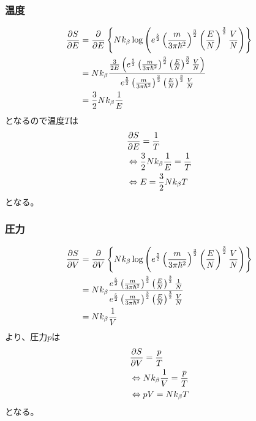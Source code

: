 \documentclass{jsarticle}  %
\numberwithin{equation}{section} %
\numberwithin{figure}{section}
\begin{document}
\subsubsection{温度}
    \begin{align}
        \frac{\partial S}{\partial E} &= \frac{\partial }{\partial E} \left\{ Nk_\beta \log \left( e^{\frac{5}{2}} \left(\frac{m}{3 \pi \hbar^2} \right)^{\frac{3}{2}} \left( \frac{E}{N} \right)^{\frac{3}{2}} \frac{V}{N} \right) \right\} \notag \\
        &= Nk_\beta \frac{ \frac{3}{2E}\left( e^{\frac{5}{2}} \left(\frac{m}{3 \pi \hbar^2} \right)^{\frac{3}{2}} \left(\frac{E}{N} \right)^{\frac{3}{2}} \frac{V}{N} \right)}{e^{\frac{5}{2}} \left(\frac{m}{3 \pi \hbar^2} \right)^{\frac{3}{2}} \left( \frac{E}{N} \right)^{\frac{3}{2}} \frac{V}{N}} \notag \\
        &=\frac{3}{2} N k_\beta \frac{1}{E} \notag 
    \end{align}
    となるので温度$T$は
    \begin{align}
        &\frac{\partial S}{\partial E} = \frac{1}{T} \notag \\
        &\Leftrightarrow  \frac{3}{2} N k_\beta \frac{1}{E} = \frac{1}{T} \notag \\
        &\Leftrightarrow E = \frac{3}{2}Nk_\beta T
    \end{align}
    となる。
\subsubsection{圧力}
    \begin{align}
        \frac{\partial S}{\partial V} &= \frac{\partial }{\partial V} \left\{ Nk_\beta \log \left( e^{\frac{5}{2}} \left(\frac{m}{3 \pi \hbar^2} \right)^{\frac{3}{2}} \left( \frac{E}{N} \right)^{\frac{3}{2}} \frac{V}{N} \right) \right\} \notag \\
        &= Nk_\beta \frac{e^{\frac{5}{2}} \left(\frac{m}{3 \pi \hbar^2} \right)^{\frac{3}{2}} \left( \frac{E}{N} \right)^{\frac{3}{2}} \frac{1}{N}}{e^{\frac{5}{2}} \left(\frac{m}{3 \pi \hbar^2} \right)^{\frac{3}{2}} \left( \frac{E}{N} \right)^{\frac{3}{2}} \frac{V}{N}} \notag \\
        &= Nk_\beta \frac{1}{V} \notag 
    \end{align}
    より、圧力$p$は
    \begin{align}
        &\frac{\partial S}{\partial V} = \frac{p}{T} \notag \\
        &\Leftrightarrow Nk_\beta \frac{1}{V} = \frac{p}{T} \notag \\
        &\Leftrightarrow pV = Nk_\beta T
    \end{align}
    となる。
\end{document}
